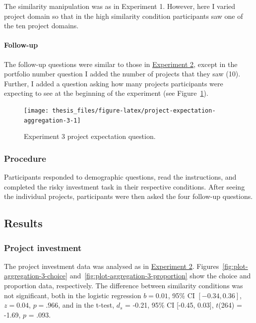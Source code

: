 \documentclass[a4paper, nobind, dvipsnames]{templates/ociamthesis}
\theoremstyle{definition}
\theoremstyle{definition}
\theoremstyle{definition}
\theoremstyle{definition}
\theoremstyle{remark}
\begin{document}
The similarity manipulation was as in Experiment 1. However, here I varied
project domain so that in the high similarity condition participants saw one of
the ten project domains.

\hypertarget{follow-up-aggregation-3}{%
\paragraph{Follow-up}\label{follow-up-aggregation-3}}

The follow-up questions were similar to those in
\protect\hyperlink{follow-up-aggregation-2}{Experiment 2}, except in the portfolio number
question I added the number of projects that they saw (10). Further, I added a
question asking how many projects participants were expecting to see at the
beginning of the experiment (see
Figure~\ref{fig:project-expectation-aggregation-3}).



\begin{figure}
\texttt{[image: thesis\_files/figure-latex/project-expectation-aggregation-3-1]} \caption{Experiment 3 project expectation question.}\label{fig:project-expectation-aggregation-3}
\end{figure}

\subsubsection{Procedure}

Participants responded to demographic questions, read the instructions, and
completed the risky investment task in their respective conditions. After seeing
the individual projects, participants were then asked the four follow-up
questions.

\subsection{Results}

\subsubsection{Project investment}

The project investment data was analysed as in
\protect\hyperlink{results-aggregation-2}{Experiment 2}.
Figures~\ref{fig:plot-aggregation-3-choice}
and~\ref{fig:plot-aggregation-3-proportion} show the choice and proportion
data, respectively. The difference between similarity conditions was not
significant, both in the logistic regression
\(b = 0.01\), 95\% CI \([-0.34, 0.36]\), \(z = 0.04\), \(p = .966\), and in the t-test,
\(d_s\) = -0.21, 95\% CI {[}-0.45, 0.03{]}, \(t\)(264) = -1.69, \(p\) = .093.
\end{document}
